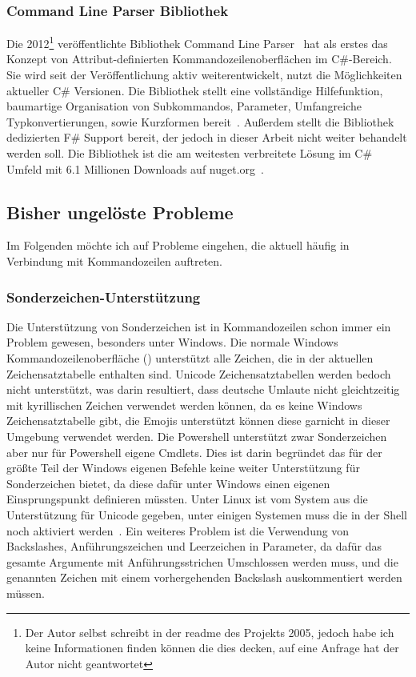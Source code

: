   \subsubsection{Command Line Parser Bibliothek}
  Die 2012\footnote{Der Autor selbst schreibt in der readme des Projekts 2005, jedoch habe ich keine Informationen finden können die dies decken, auf eine Anfrage hat der Autor nicht geantwortet} veröffentlichte Bibliothek Command Line Parser~\cite{FirstCommandLineParserCommit}  
  hat als erstes das Konzept von Attribut-definierten Kommandozeilenoberflächen im C\#-Bereich.
  Sie wird seit der Veröffentlichung aktiv weiterentwickelt, nutzt die Möglichkeiten aktueller C\# Versionen.
  Die Bibliothek stellt eine vollständige Hilfefunktion, baumartige Organisation von Subkommandos, Parameter, Umfangreiche Typkonvertierungen, sowie Kurzformen bereit~\cite{CommandLineParserWiki}.
  Au\ss erdem stellt die Bibliothek dedizierten F\# Support bereit, der jedoch in dieser Arbeit nicht weiter behandelt werden soll.
  Die Bibliothek ist die am weitesten verbreitete Lösung im C\# Umfeld mit 6.1 Millionen Downloads auf nuget.org~\cite{CommandLineParserNuget}. 
  \subsection{Bisher ungelöste Probleme}\label{subsec:currentproblems}
  Im Folgenden möchte ich auf Probleme eingehen, die aktuell häufig in Verbindung mit 
Kommandozeilen auftreten.
  \subsubsection{Sonderzeichen-Unterstützung}
Die Unterstützung von Sonderzeichen ist in Kommandozeilen schon immer ein Problem gewesen,
 besonders unter Windows.
Die normale Windows Kommandozeilenoberfläche ()
unterstützt alle Zeichen, die in der aktuellen Zeichensatztabelle enthalten sind. Unicode 
Zeichensatztabellen werden bedoch nicht unterstützt, was darin resultiert, dass deutsche Umlaute 
nicht gleichtzeitig mit kyrillischen Zeichen verwendet werden können, da es keine Windows 
Zeichensatztabelle gibt, die Emojis unterstützt können diese garnicht in dieser Umgebung
verwendet werden.
Die Powershell unterstützt zwar Sonderzeichen aber nur für Powershell eigene Cmdlets.
  Dies ist darin begründet das für der gr\"o\ss te Teil der Windows eigenen Befehle keine weiter Unterst\"utzung f\"ur Sonderzeichen bietet, 
  da diese dafür unter Windows einen eigenen Einsprungspunkt definieren müssten.
  Unter Linux ist vom System aus die Unterstützung für Unicode gegeben, unter einigen Systemen muss die in der Shell noch aktiviert werden~\cite{LinuxUnicode}.
  Ein weiteres Problem ist die Verwendung von Backslashes, Anführungszeichen und Leerzeichen in Parameter, da dafür das gesamte Argumente mit Anführungsstrichen Umschlossen werden muss, und die genannten Zeichen mit einem vorhergehenden Backslash auskommentiert werden müssen.
